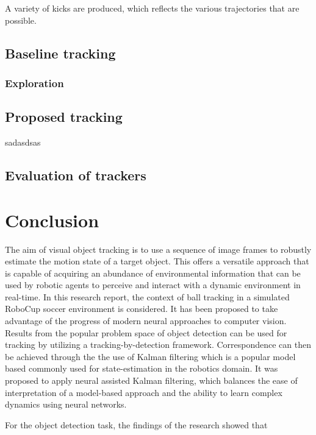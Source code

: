 \documentclass[a4paper,twoside,12pt]{report}
\begin{document}
A variety of kicks are produced, which reflects the various trajectories that are possible. 

\section{Baseline tracking}

\subsection{Exploration}

\section{Proposed tracking}

sadasdsas

\section{Evaluation of trackers}

\chapter{Conclusion}

The aim of visual object tracking is to use a sequence of image frames to robustly estimate the motion state of a target object. This offers a versatile approach that is capable of acquiring an abundance of environmental information that can be used by robotic agents to perceive and interact with a dynamic environment in real-time. In this research report, the context of ball tracking in a simulated RoboCup soccer environment is considered. It has been proposed to take advantage of the progress of modern neural approaches to computer vision. Results from the popular problem space of object detection can be used for tracking by utilizing a tracking-by-detection framework. Correspondence can then be achieved through the the use of Kalman filtering which is a popular model based commonly used for state-estimation in the robotics domain. It was proposed to apply neural assisted Kalman filtering, which balances the ease of interpretation of a model-based approach and the ability to learn complex dynamics using neural networks. 

For the object detection task, the findings of the research showed that
\end{document}
